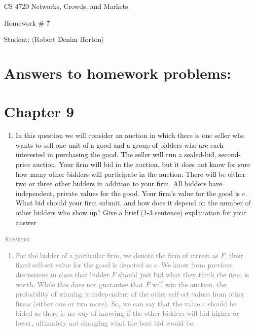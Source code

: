 \documentclass[11pt]{article}
\begin{document}
 

\rhead{\today}

\begin{center}\begin{Large}
CS 4720 Networks, Crowds, and Markets

Homework \# 7

Student: (Robert Denim Horton)
\end{Large}
\end{center}

\section*{Answers to homework problems:}

\section*{Chapter 9}

\begin{enumerate}
	 \item In this question we will consider an auction in which there is one seller who wants to sell one unit of a good and a group of bidders who are each interested in purchasing the good. The seller will run a sealed-bid, second-price auction. Your firm will bid in the auction, but it does not know for sure how many other bidders will participate in the auction. There will be either two or three other bidders in addition to your firm. All bidders have independent, private values for the good. Your firm’s value for the good is c. What bid should your firm submit, and how does it depend on the number of other bidders who show up? Give a brief (1-3 sentence) explanation for your answer 
\end{enumerate}
\textcolor{gray}{
Answers:
\begin{enumerate}
	\item For the bidder of a particular firm, we denote the firm of intrest as $F$, their fixed self-set value for the good is denoted as $c$. We know from previous discussions in class that bidder $F$ should just bid what they think the item is worth.  While this does not guarantee that $F$ will win the auction, the probability of winning is independent of the other self-set values from other firms (either one or two more).  So, we can say that the value $c$ should be bided as there is no way of knowing if the other bidders will bid higher or lower, ultimately not changing what the best bid would be.  \\
\end{enumerate}
}
\end{document}
